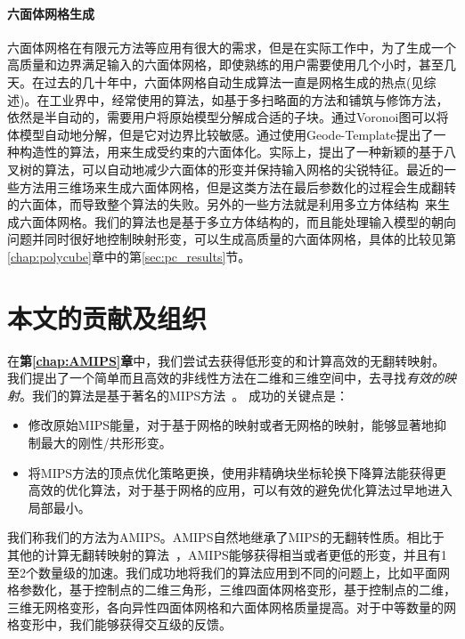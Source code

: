 \paragraph{六面体网格生成}
六面体网格在有限元方法等应用有很大的需求，但是在实际工作中，为了生成一个高质量和边界满足输入的六面体网格，即使熟练的用户需要使用几个小时，甚至几天。在过去的几十年中，六面体网格自动生成算法一直是网格生成的热点(见综述\cite{owen1998survey,shimada2006current,shepherd2008hexahedral})。在工业界中，经常使用的算法，如基于多扫略面的方法\cite{shepherd2000methods}和铺筑与修饰方法\cite{staten2005unconstrained}，依然是半自动的，需要用户将原始模型分解成合适的子块。\cite{sheffer1999hexahedral}通过Voronoi图可以将体模型自动地分解，但是它对边界比较敏感。\cite{carbonera2006constructive}通过使用Geode-Template提出了一种构造性的算法，用来生成受约束的六面体化。实际上，\cite{marechal2009}提出了一种新颖的基于八叉树的算法，可以自动地减少六面体的形变并保持输入网格的尖锐特征。最近的一些方法用三维场来生成六面体网格\cite{Nieser2011,Li2012}，但是这类方法在最后参数化的过程会生成翻转的六面体，而导致整个算法的失败。另外的一些方法就是利用多立方体结构~\cite{HanXiaHe2010,Gregson2011,Huang2014}来生成六面体网格。我们的算法也是基于多立方体结构的，而且能处理输入模型的朝向问题并同时很好地控制映射形变，可以生成高质量的六面体网格，具体的比较见第\ref{chap:polycube}章中的第\ref{sec:pc_results}节。


\section{本文的贡献及组织}
在\textbf{第\ref{chap:AMIPS}章}中，我们尝试去获得低形变的和计算高效的无翻转映射。我们提出了一个简单而且高效的非线性方法在二维和三维空间中，去寻找\emph{有效的映射}。我们的算法是基于著名的MIPS方法~\cite{Hormann2000}。 成功的关键点是：
\begin{itemize}
    \item 修改原始MIPS能量，对于基于网格的映射或者无网格的映射，能够显著地抑制最大的刚性/共形形变。
    \item 将MIPS方法的顶点优化策略更换，使用非精确块坐标轮换下降算法能获得更高效的优化算法，对于基于网格的应用，可以有效的避免优化算法过早地进入局部最小。
\end{itemize}
我们称我们的方法为AMIPS。AMIPS自然地继承了MIPS的无翻转性质。相比于其他的计算无翻转映射的算法~\cite{Lipman2012,Schuller2013,Levi2014}，AMIPS能够获得相当或者更低的形变，并且有1至2个数量级的加速。我们成功地将我们的算法应用到不同的问题上，比如平面网格参数化，基于控制点的二维三角形，三维四面体网格变形，基于控制点的二维，三维无网格变形，各向异性四面体网格和六面体网格质量提高。对于中等数量的网格变形中，我们能够获得交互级的反馈。

